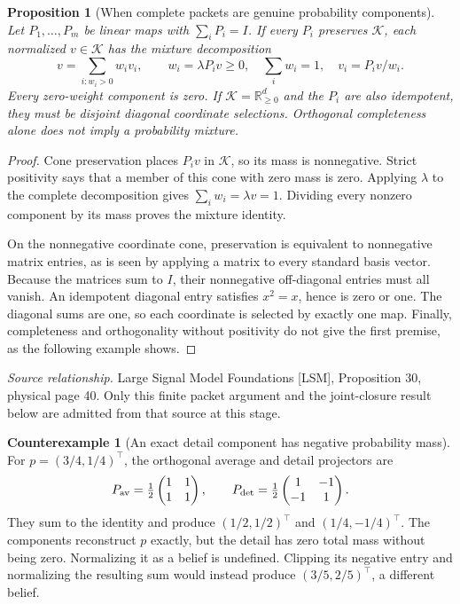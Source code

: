 \documentclass[11pt,oneside,openany]{book}
\newtheorem{proposition}[theorem]{Proposition}
\theoremstyle{definition}\newtheorem{definition}[theorem]{Definition}
\newtheorem{counterexample}[theorem]{Counterexample}
\newcommand{\source}[1]{\par{\small\textit{Source relationship.} #1}\par}
\begin{document}
\begin{proposition}[When complete packets are genuine probability components]\label{r:positive-packets}
Let $P_1,\ldots,P_m$ be linear maps with $\sum_iP_i=I$. If every $P_i$ preserves $\mathcal K$, each normalized $v\in\mathcal K$ has the mixture decomposition
\[
 v=\sum_{i:w_i>0}w_i v_i,\qquad
 w_i=\lambda P_iv\ge0,\quad \sum_iw_i=1,\quad v_i=P_iv/w_i.
\]
Every zero-weight component is zero. If $\mathcal K=\mathbb R^d_{\ge0}$ and the $P_i$ are also idempotent, they must be disjoint diagonal coordinate selections. Orthogonal completeness alone does not imply a probability mixture.
\end{proposition}
\begin{proof}
Cone preservation places $P_iv$ in $\mathcal K$, so its mass is nonnegative. Strict positivity says that a member of this cone with zero mass is zero. Applying $\lambda$ to the complete decomposition gives $\sum_iw_i=\lambda v=1$. Dividing every nonzero component by its mass proves the mixture identity.

On the nonnegative coordinate cone, preservation is equivalent to nonnegative matrix entries, as is seen by applying a matrix to every standard basis vector. Because the matrices sum to $I$, their nonnegative off-diagonal entries must all vanish. An idempotent diagonal entry satisfies $x^2=x$, hence is zero or one. The diagonal sums are one, so each coordinate is selected by exactly one map. Finally, completeness and orthogonality without positivity do not give the first premise, as the following example shows.
\end{proof}
\source{Large Signal Model Foundations [LSM], Proposition 30, physical page 40. Only this finite packet argument and the joint-closure result below are admitted from that source at this stage.}

\begin{counterexample}[An exact detail component has negative probability mass]\label{ce:signed-packet}
For $p=(3/4,1/4)^\top$, the orthogonal average and detail projectors are
\[
 P_{\rm av}=\tfrac12\begin{pmatrix}1&1\\1&1\end{pmatrix},\qquad
 P_{\rm det}=\tfrac12\begin{pmatrix}1&-1\\-1&1\end{pmatrix}.
\]
They sum to the identity and produce $(1/2,1/2)^\top$ and $(1/4,-1/4)^\top$. The components reconstruct $p$ exactly, but the detail has zero total mass without being zero. Normalizing it as a belief is undefined. Clipping its negative entry and normalizing the resulting sum would instead produce $(3/5,2/5)^\top$, a different belief.
\end{counterexample}
\end{document}
